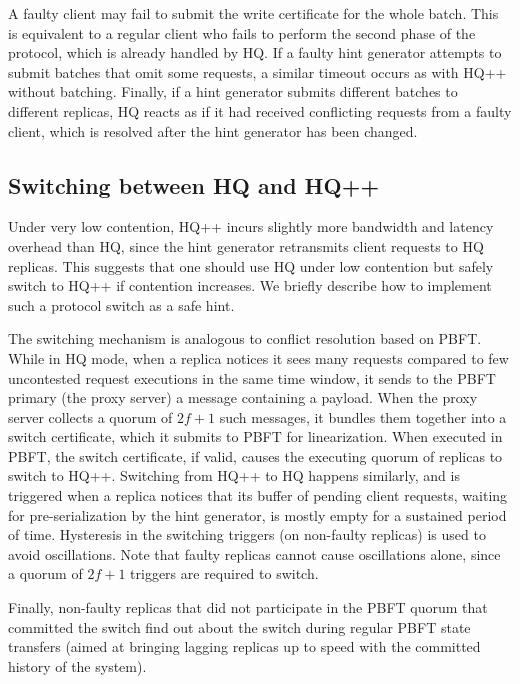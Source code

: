 \documentclass[twocolumn,10pt]{article}
\begin{document}
 A faulty client may fail to submit the write
certificate for the whole batch. This is equivalent to a regular
client who fails to perform the second phase of the protocol, which is
already handled by HQ. If a faulty hint generator attempts to submit
batches that omit some requests, a similar timeout occurs as with HQ++
without batching.  Finally, if a hint generator submits different
batches to different replicas, HQ reacts as if it had received
conflicting requests from a faulty client, which is resolved after the
hint generator has been changed.


\subsection{Switching between HQ and HQ++}

Under very low contention, HQ++ incurs slightly more bandwidth and
latency overhead than HQ, since the hint generator retransmits client
requests to HQ replicas.  This suggests that one should use HQ under
low contention but safely switch to HQ++ if contention increases.  We
briefly describe how to implement such a protocol switch as a safe
hint.

The switching mechanism is analogous to conflict resolution based on
PBFT.  While in HQ mode, when a replica notices it sees many
 requests compared to few uncontested request  executions
in the same time window, it sends to the PBFT primary (the proxy server) a
 message containing a  payload.  When the proxy
server collects a quorum of $2f+1$ such messages, it bundles them
together into a switch certificate, which it submits to PBFT for
linearization.  When executed in PBFT, the switch certificate, if valid, causes the executing quorum
of replicas to switch to HQ++.  Switching from HQ++ to HQ happens
similarly, and is triggered when a replica notices that its buffer of pending client
requests, waiting for pre-serialization by the hint generator, is mostly
empty for a sustained period of time.  Hysteresis in the switching
triggers (on non-faulty replicas) is used to avoid oscillations.
Note that faulty replicas cannot cause oscillations alone, since a
quorum of $2f+1$ triggers are required to switch.

Finally, non-faulty replicas that did not participate in the PBFT quorum
that committed the switch find out about the switch during regular PBFT
state transfers (aimed at bringing lagging replicas up to speed with the
committed history of the system).
\end{document}
